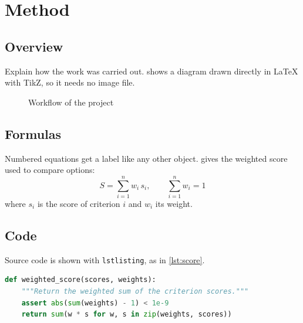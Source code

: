 \section{Method}\label{sec:method}

\subsection{Overview}\label{sec:overview}
Explain how the work was carried out.  shows a diagram drawn directly in LaTeX with TikZ, so it needs no image file.

\begin{figure}[H]
  \centering
  \caption{Workflow of the project}\label{fig:workflow}
\end{figure}


\subsection{Formulas}\label{sec:formulas}
Numbered equations get a label like any other object.  gives the weighted score used to compare options:
\begin{equation}
  S = \sum_{i=1}^{n} w_i \, s_i, \qquad \sum_{i=1}^{n} w_i = 1
  \label{eq:weighted-score}
\end{equation}
where $s_i$ is the score of criterion $i$ and $w_i$ its weight.

\subsection{Code}\label{sec:code}
Source code is shown with \texttt{lstlisting}, as in \cref{lst:score}.

\begin{lstlisting}[language=Python, caption={Computing the weighted score}, label={lst:score}]
def weighted_score(scores, weights):
    """Return the weighted sum of the criterion scores."""
    assert abs(sum(weights) - 1) < 1e-9
    return sum(w * s for w, s in zip(weights, scores))
\end{lstlisting}
